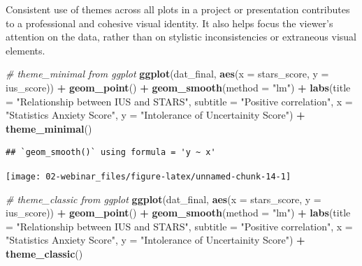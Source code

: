 \documentclass[
  oneside]{book}
\newenvironment{Shaded}{\begin{snugshade}}{\end{snugshade}}
\newcommand{\AttributeTok}[1]{\textcolor[rgb]{0.13,0.29,0.53}{#1}}
\newcommand{\CommentTok}[1]{\textcolor[rgb]{0.56,0.35,0.01}{\textit{#1}}}
\newcommand{\FunctionTok}[1]{\textcolor[rgb]{0.13,0.29,0.53}{\textbf{#1}}}
\newcommand{\NormalTok}[1]{#1}
\newcommand{\SpecialCharTok}[1]{\textcolor[rgb]{0.81,0.36,0.00}{\textbf{#1}}}
\newcommand{\StringTok}[1]{\textcolor[rgb]{0.31,0.60,0.02}{#1}}
\begin{document}
Consistent use of themes across all plots in a project or presentation contributes to a professional and cohesive visual identity. It also helps focus the viewer's attention on the data, rather than on stylistic inconsistencies or extraneous visual elements.

\begin{Shaded}
\begin{Highlighting}[]
\CommentTok{\# theme\_minimal from ggplot}
\FunctionTok{ggplot}\NormalTok{(dat\_final, }\FunctionTok{aes}\NormalTok{(}\AttributeTok{x =}\NormalTok{ stars\_score, }\AttributeTok{y =}\NormalTok{ ius\_score)) }\SpecialCharTok{+}
  \FunctionTok{geom\_point}\NormalTok{() }\SpecialCharTok{+}
  \FunctionTok{geom\_smooth}\NormalTok{(}\AttributeTok{method =} \StringTok{"lm"}\NormalTok{) }\SpecialCharTok{+}
  \FunctionTok{labs}\NormalTok{(}\AttributeTok{title =} \StringTok{"Relationship between IUS and STARS"}\NormalTok{,}
       \AttributeTok{subtitle =} \StringTok{"Positive correlation"}\NormalTok{,}
       \AttributeTok{x =} \StringTok{"Statistics Anxiety Score"}\NormalTok{,}
       \AttributeTok{y =} \StringTok{"Intolerance of Uncertainity Score"}\NormalTok{) }\SpecialCharTok{+}
  \FunctionTok{theme\_minimal}\NormalTok{()}
\end{Highlighting}
\end{Shaded}

\begin{verbatim}
## `geom_smooth()` using formula = 'y ~ x'
\end{verbatim}

\begin{center}\texttt{[image: 02-webinar\_files/figure-latex/unnamed-chunk-14-1]} \end{center}

\begin{Shaded}
\begin{Highlighting}[]
\CommentTok{\# theme\_classic from ggplot}
\FunctionTok{ggplot}\NormalTok{(dat\_final, }\FunctionTok{aes}\NormalTok{(}\AttributeTok{x =}\NormalTok{ stars\_score, }\AttributeTok{y =}\NormalTok{ ius\_score)) }\SpecialCharTok{+}
  \FunctionTok{geom\_point}\NormalTok{() }\SpecialCharTok{+}
  \FunctionTok{geom\_smooth}\NormalTok{(}\AttributeTok{method =} \StringTok{"lm"}\NormalTok{) }\SpecialCharTok{+}
  \FunctionTok{labs}\NormalTok{(}\AttributeTok{title =} \StringTok{"Relationship between IUS and STARS"}\NormalTok{,}
       \AttributeTok{subtitle =} \StringTok{"Positive correlation"}\NormalTok{,}
       \AttributeTok{x =} \StringTok{"Statistics Anxiety Score"}\NormalTok{,}
       \AttributeTok{y =} \StringTok{"Intolerance of Uncertainity Score"}\NormalTok{) }\SpecialCharTok{+}
  \FunctionTok{theme\_classic}\NormalTok{()}
\end{Highlighting}
\end{Shaded}
\end{document}
